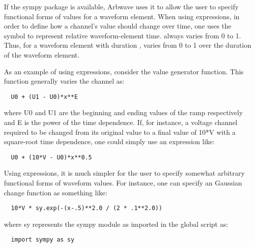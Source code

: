 If the sympy package is available, Arbwave uses it to allow the user to specify
functional forms of values for a waveform element.  When using expressions, in
order to define how a channel's value should change over time, one uses the
symbol  to represent relative waveform-element time.
 always varies
from 0 to 1.  Thus, for a waveform element with duration ,
 varies from 0 to 1
over the duration of the waveform element.

As an example of using expressions, consider the  value generator
function.  This function generally varies the channel as:
%
\begin{lstlisting}
  U0 + (U1 - U0)*x**E
\end{lstlisting}
%
where U0 and U1 are the beginning and ending values of the ramp respectively and
E is the power of the time dependence.  If, for instance, a voltage channel
required to be changed from its original value to a final value of 10*V with a
square-root time dependence, one could simply use an expression like:
%
\begin{lstlisting}
  U0 + (10*V - U0)*x**0.5
\end{lstlisting}
%
Using expressions, it is much simpler for the user to specify somewhat arbitrary
functional forms of waveform values.  For instance, one can specify an Gaussian
change function as something like:
%
\begin{lstlisting}
  10*V * sy.exp(-(x-.5)**2.0 / (2 * .1**2.0))
\end{lstlisting}
%
where sy represents the sympy module as imported in the global script as:
\begin{lstlisting}
  import sympy as sy
\end{lstlisting}

